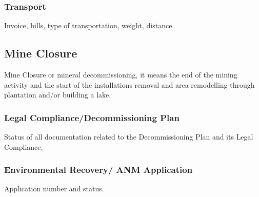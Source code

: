 \subsubsection{Transport}\label{sec:Transport}
Invoice, bills, type of transportation, weight, distance.

\subsection{Mine Closure}\label{sec:MineClosure}
Mine Closure or mineral decommissioning, it means the end of the mining activity and the start of the installations removal and area remodelling through plantation and/or building a lake.

\subsubsection{Legal Compliance/Decommissioning Plan}\label{sec:LegalCompliance}
Status of all documentation related to the Decommissioning Plan and its Legal Compliance.

\subsubsection{Environmental Recovery/ ANM Application}\label{sec:EnvironmentalRecovery}
Application number and status.

